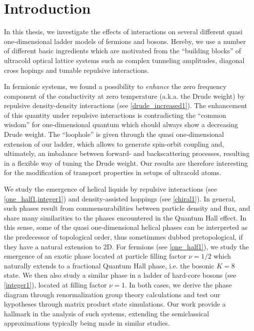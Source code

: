 
\chapter*{Introduction}
In this thesis, we investigate the effects of interactions on several different quasi one-dimensional ladder models of fermions and bosons.
Hereby, we use a number of different basic ingredients which are motivated from the ``building blocks'' of ultracold optical lattice systems such as complex tunneling amplitudes, diagonal cross hopings and tunable repulsive interactions.

In fermionic systems, we found a possibility to {\it enhance} the zero frequency component of the conductivity at zero temperature (a.k.a. the Drude weight) by repulsive density-density interactions (see \cref{drude_increased1}).
The enhancement of this quantity under repulsive interactions is contradicting the ``common wisdom'' for one-dimensional quantum which should always show a decreasing Drude weight.
The ``loophole'' is given through the quasi one-dimensional extension of our ladder, which allows to generate spin-orbit coupling and, ultimately, an imbalance between forward- and backscattering processes, resulting in a flexible way of tuning the Drude weight.
Our results are therefore interesting for the modification of transport properties in setups of ultracold atoms.

We study the emergence of helical liquids by repulsive interactions (see \cref{one_half1,integer1}) and density-assisted hoppings (see \cref{chiral1}).
In general, such phases result from commensurabilities between particle density and flux, and share many similarities to the phases encountered in the Quantum Hall effect.
In this sense, some of the quasi one-dimensional helical phases can be interpreted as the predecessor of topological order, thus sometimmes dubbed pretopological, if they have a natural extension to 2D.
For fermions (see \cref{one_half1}), we study the emergence of an exotic phase located at particle filling factor $\nu=1/2$ which naturally extends to a fractional Quantum Hall phase, i.e. the bosonic $K=8$ state.
We then also study a similar phase in a ladder of hard-core bosons (see \cref{integer1}), located at filling factor $\nu=1$.
In both cases, we derive the phase diagram through renormalization group theory calculations and test our hypotheses through matrix product state simulations.
Our work provide a hallmark in the analysis of such systems, extending the semiclassical approximations typically being made in similar studies.

